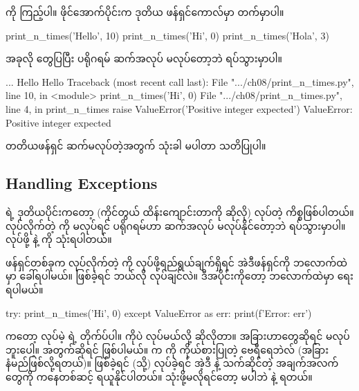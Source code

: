  ကို  ကြည့်ပါ။ ဖိုင်အောက်ပိုင်းက ဒုတိယ ဖန်ရှင်ကောလ်မှာ  တက်မှာပါ။
%
\begin{py}
print_n_times('Hello', 10)
print_n_times('Hi', 0)
print_n_times('Hola', 3)
\end{py}
%
အခုလို  တွေပြပြီး ပရိုဂရမ် ဆက်အလုပ် မလုပ်တော့ဘဲ ရပ်သွားမှာပါ။ 
\begin{codetxt}
...
Hello
Hello
Traceback (most recent call last):
  File ".../ch08/print_n_times.py", line 10, in <module>
    print_n_times('Hi', 0)
  File ".../ch08/print_n_times.py", line 4, in print_n_times
    raise ValueError('Positive integer expected')
ValueError: Positive integer expected
\end{codetxt}
တတိယဖန်ရှင် ဆက်မလုပ်တဲ့အတွက်  သုံးခါ မပါတာ သတိပြုပါ။ 

\subsection*{Handling Exceptions}
 ရဲ့ ဒုတိယပိုင်းကတော့  (ကိုင်တွယ် ထိန်းကျောင်းတာကို ဆိုလို) လုပ်တဲ့ ကိစ္စဖြစ်ပါတယ်။
 လုပ်လိုက်တဲ့  ကို  မလုပ်ရင် ပရိုဂရမ်ဟာ ဆက်အလုပ် မလုပ်နိုင်တော့ဘဲ ရပ်သွားမှာပါ။  လုပ်ဖို့  နဲ့  ကို သုံးရပါတယ်။


ဖန်ရှင်တစ်ခုက  လုပ်လိုက်တဲ့  ကို  လုပ်ဖို့ရည်ရွယ်ချက်ရှိရင် အဲဒီဖန်ရှင်ကို   ဘလောက်ထဲမှာ ခေါ်ရပါမယ်။  ဖြစ်ခဲ့ရင် ဘယ်လို  လုပ်ချင်လဲ။ ဒီအပိုင်းကိုတော့  ဘလောက်ထဲမှာ ရေးရပါမယ်။
%
\begin{py}
try:
    print_n_times('Hi', 0)
except ValueError as err:
    print(f'Error: {err}')
\end{py}
%
 ကတော့  လုပ်မဲ့  ရဲ့ တိုက်ပ်ပါ။    ကိုပဲ  လုပ်မယ်လို့ ဆိုလိုတာ။ အခြားဟာတွေဆိုရင်  မလုပ်ဘူးပေါ့။  အတွက်ဆိုရင်  ဖြစ်ပါမယ်။   က  ကို ကိုယ်စားပြုတဲ့  ဗေရီရေဘဲလ် (အခြား နံမည်ဖြစ်လို့ရတယ်)။  ဖြစ်ခဲ့ရင် (သို့)  လုပ်ခဲ့ရင် အဲ့ဒီ   နဲ့ သက်ဆိုင်တဲ့ အချက်အလက်တွေကို   ကနေတစ်ဆင့် ရယူနိုင်ပါတယ်။ သုံးဖို့မလိုရင်တော့  မပါဘဲ  နဲ့ ရတယ်။

